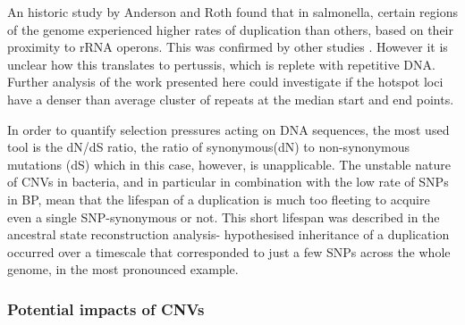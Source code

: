 \documentclass{article}
\begin{document}
An historic study by Anderson and Roth found that in salmonella, certain regions of the genome experienced higher rates of duplication than others, based on their proximity to rRNA operons. This was confirmed by other studies . However it is unclear how this translates to pertussis, which is replete with repetitive DNA. Further analysis of the work presented here could investigate if the hotspot loci have a denser than average cluster of repeats at the median start and end points.






In order to quantify selection pressures acting on DNA sequences, the most used tool is the dN/dS ratio, the ratio of synonymous(dN) to non-synonymous mutations (dS) which in this case, however, is unapplicable. The unstable nature of CNVs in bacteria, and in particular in combination with the low rate of SNPs in BP, mean that the lifespan of a duplication is much too fleeting to acquire even a single SNP-synonymous or not. This short lifespan was described in the ancestral state reconstruction analysis- hypothesised inheritance of a duplication occurred over a timescale that corresponded to just a few SNPs across the whole genome, in the most pronounced example.




\subsubsection{Potential impacts of CNVs}
\end{document}
